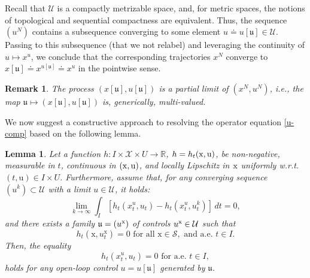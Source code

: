 \documentclass[sn-mathphys-num]{sn-jnl}
\numberwithin{equation}{section}
\theoremstyle{mythm}
\newtheorem{lemma}[proposition]{Lemma}
\theoremstyle{mydef}
\newtheorem{remark}[proposition]{Remark}
\renewcommand{\d}{\,d}
\newcommand{\R}{\mathbb{R}}
\begin{document}
Recall that $\mathcal U$ is a compactly metrizable space, and, for metric spaces, the notions of topological and sequential compactness are equivalent. Thus, the sequence $(u^N)$ contains a subsequence converging to some element $u\doteq u[\mathfrak u] \in \mathcal U$. Passing to this subsequence (that we not relabel) and leveraging the continuity of $u \mapsto x^{u}$, we %
conclude that the corresponding trajectories $x^N$ converge to $x[\mathfrak u]\doteq x^{u[\mathfrak u]} \doteq x^{u}$ in the pointwise sense.
\begin{remark}
    The process $(x[\mathfrak{u}], u[\mathfrak{u}])$ is a partial limit of $(x^N, u^N)$, i.e., the map $\mathfrak{u} \mapsto (x[\mathfrak{u}], u[\mathfrak{u}])$ is, generically, multi-valued. 
\end{remark}

We now suggest a constructive approach to resolving the operator equation \eqref{u-comp} based on the following lemma. %
\begin{lemma}\label{lem:sampl}
Let a function $h \colon I \times \mathcal X \times U \to \R$, $h = h_t({\rm x}, {\mathrm u})$, be non-negative, measurable in $t$, continuous in $({\rm x, u})$,  and locally Lipschitz in $\rm x$ uniformly w.r.t. $(t, \mathrm u) \in I \times U$. Furthermore, assume that, for any converging sequence $(u^k) \subset \mathcal U$ with a limit $u \in \mathcal U$, it holds:
\[
    \lim_{k \to \infty}\int_I \left[h_t(x_t^{u}, u_t) - h_t(x_t^{u}, u^k_t)\right] \d t = 0,
\]
and there exists a family $\mathfrak{u}=(u^{\rm x})$ of controls $u^{\rm x} \in \mathcal U$ such that
\[
 h_t(\mathrm x, u^{\mathrm x}_t) = 0 \mbox{ for all }\mathrm x\in \mathcal S,\mbox{ and a.e. } t \in I.
\]    
Then, the equality 
\[
 h_t(x_t^{u}, u_t) = 0\mbox{ for a.e. }t\in I,
\]
holds for any open-loop control \(u = u[\mathfrak{u}]\) generated by $\mathfrak{u}$.
\end{lemma}
\end{document}
